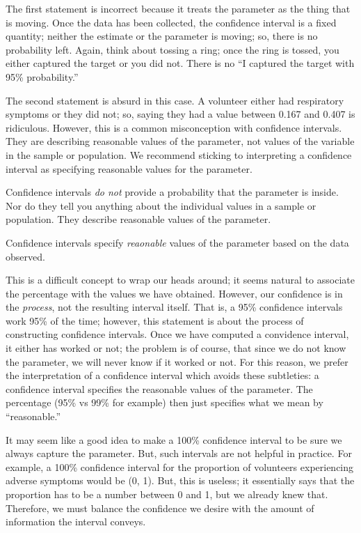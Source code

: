 \documentclass[]{book}
\theoremstyle{definition}
\theoremstyle{definition}
\theoremstyle{definition}
\theoremstyle{remark}
\let\BeginKnitrBlock\begin \let\EndKnitrBlock\end
\begin{document}
The first statement is incorrect because it treats the parameter as the
thing that is moving. Once the data has been collected, the confidence
interval is a fixed quantity; neither the estimate or the parameter is
moving; so, there is no probability left. Again, think about tossing a
ring; once the ring is tossed, you either captured the target or you did
not. There is no ``I captured the target with 95\% probability.''

The second statement is absurd in this case. A volunteer either had
respiratory symptoms or they did not; so, saying they had a value
between 0.167 and 0.407 is ridiculous. However, this is a common
misconception with confidence intervals. They are describing reasonable
values of the parameter, not values of the variable in the sample or
population. We recommend sticking to interpreting a confidence interval
as specifying reasonable values for the parameter.

\BeginKnitrBlock{rmdtip}
Confidence intervals \emph{do not} provide a probability that the
parameter is inside. Nor do they tell you anything about the individual
values in a sample or population. They describe reasonable values of the
parameter.
\EndKnitrBlock{rmdtip}

\BeginKnitrBlock{rmdkeyidea}
Confidence intervals specify \emph{reaonable} values of the parameter
based on the data observed.
\EndKnitrBlock{rmdkeyidea}

This is a difficult concept to wrap our heads around; it seems natural
to associate the percentage with the values we have obtained. However,
our confidence is in the \emph{process}, not the resulting interval
itself. That is, a 95\% confidence intervals work 95\% of the time;
however, this statement is about the process of constructing confidence
intervals. Once we have computed a convidence interval, it either has
worked or not; the problem is of course, that since we do not know the
parameter, we will never know if it worked or not. For this reason, we
prefer the interpretation of a confidence interval which avoids these
subtleties: a confidence interval specifies the reasonable values of the
parameter. The percentage (95\% vs 99\% for example) then just specifies
what we mean by ``reasonable.''

It may seem like a good idea to make a 100\% confidence interval to be
sure we always capture the parameter. But, such intervals are not
helpful in practice. For example, a 100\% confidence interval for the
proportion of volunteers experiencing adverse symptoms would be (0, 1).
But, this is useless; it essentially says that the proportion has to be
a number between 0 and 1, but we already knew that. Therefore, we must
balance the confidence we desire with the amount of information the
interval conveys.
\end{document}
